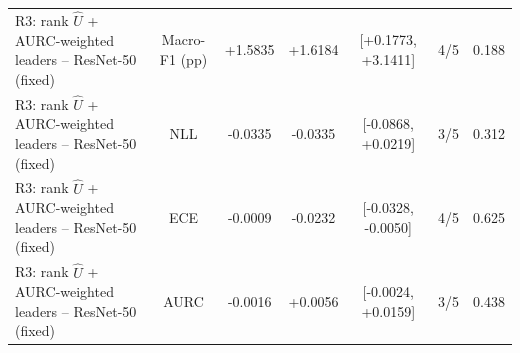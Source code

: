 \begin{table}[t]
\begin{tabular}{lcccccc}
R3: rank $\hat{U}$ + AURC-weighted leaders -- ResNet-50 (fixed) & Macro-F1 (pp) & +1.5835 & +1.6184 & [+0.1773, +3.1411] & 4/5 & 0.188 \\
R3: rank $\hat{U}$ + AURC-weighted leaders -- ResNet-50 (fixed) & NLL & -0.0335 & -0.0335 & [-0.0868, +0.0219] & 3/5 & 0.312 \\
R3: rank $\hat{U}$ + AURC-weighted leaders -- ResNet-50 (fixed) & ECE & -0.0009 & -0.0232 & [-0.0328, -0.0050] & 4/5 & 0.625 \\
R3: rank $\hat{U}$ + AURC-weighted leaders -- ResNet-50 (fixed) & AURC & -0.0016 & +0.0056 & [-0.0024, +0.0159] & 3/5 & 0.438 \\
\bottomrule
\end{tabular}
\end{table}
